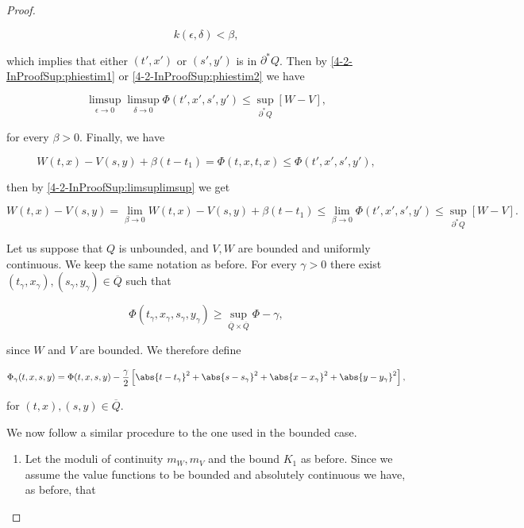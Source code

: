 \begin{proof}
\begin{enumerate}
        \[k(\epsilon,\delta) < \beta,\]

        which implies that either $(t',x')$ or $(s',y')$ is in $\partial^{\ast}Q$. Then by \ref{4-2-InProofSup:phiestim1} 
        or \ref{4-2-InProofSup:phiestim2} we have

        \begin{equation}\label{4-2-InProofSup:limsuplimsup}
            \limsup_{\epsilon\to0}\limsup_{\delta\to0} \Phi(t',x',s',y') \leq \sup_{\partial^{\ast}Q}[W-V],
        \end{equation}

        for every $\beta>0$. Finally, we have

        \[W(t,x) - V(s,y) + \beta(t-t_1) = \Phi(t,x,t,x) \leq \Phi(t',x',s',y'),\]

        then by \ref{4-2-InProofSup:limsuplimsup} we get

        \[W(t,x) - V(s,y) = \lim_{\beta\to0}W(t,x) - V(s,y) + \beta(t-t_1)\leq \lim_{\beta\to0}\Phi(t',x',s',y')\leq \sup_{\partial^{\ast}Q}[W-V].\]
    \end{enumerate}

    Let us suppose that $Q$ is unbounded, and $V,W$ are bounded and uniformly continuous. We keep the same notation as before. For every $\gamma>0$ 
    there exist $(t_{\gamma},x_{\gamma}),(s_{\gamma},y_{\gamma})\in \overline{Q}$ such that
    
    \begin{equation}
        \Phi(t_{\gamma},x_{\gamma},s_{\gamma},y_{\gamma}) \geq \sup_{\overline{Q}\times\overline{Q}}\Phi - \gamma,
    \end{equation}

    since $W$ and $V$ are bounded. We therefore define

    \begin{equation}
        \Phi_{\gamma}(t,x,s,y) = \Phi(t,x,s,y) - \frac{\gamma}{2}\left[\abs{t-t_{\gamma}}^2+\abs{s-s_{\gamma}}^2 + \abs{x-x_{\gamma}}^2 + \abs{y-y_{\gamma}}^2\right],
    \end{equation}

    for $(t,x),(s,y)\in \overline{Q}$. 
    
    We now follow a similar procedure to the one used in the bounded case.

    \begin{enumerate}
        \item Let the moduli of continuity $m_W,m_V$ and the bound $K_1$ as before. Since we assume the value functions to be bounded and 
        absolutely continuous we have, as before, that
        

\end{enumerate}
\end{proof}
